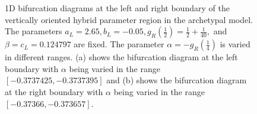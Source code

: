 \begin{figure}
	\centering
	\caption[1D bifurcation diagrams at the left and right boundary of the vertically oriented hybrid parameter region in the archetypal model]{
		1D bifurcation diagrams at the left and right boundary of the vertically oriented hybrid parameter region in the archetypal model.
		The parameters $a_L = 2.65, b_L = -0.05, g_R\left(\frac{1}{2}\right) = \frac{1}{2} + \frac{1}{40},$ and $\beta = c_L = 0.124797$ are fixed.
		The parameter $\alpha = -g_R\left(\frac{1}{4}\right)$ is varied in different ranges.
		(a) shows the bifurcation diagram at the left boundary with $\alpha$ being varied in the range $[-0.3737425, -0.3737395]$
		and (b) shows the bifurcation diagram at the right boundary with $\alpha$ being varied in the range $[-0.37366, -0.373657]$.
	}
	\label{fig:add.appa.vert.bif}
\end{figure}
